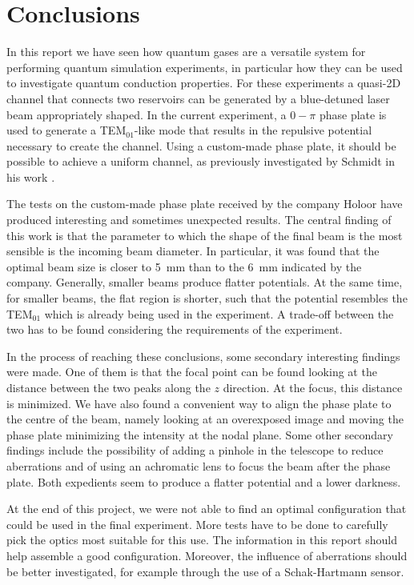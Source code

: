 \chapter{Conclusions}
In this report we have seen how quantum gases are a versatile system for performing quantum simulation experiments, in particular how they can be used to investigate quantum conduction properties. For these experiments a quasi-2D channel that connects two reservoirs can be generated by a blue-detuned laser beam appropriately shaped. In the current experiment, a $0-\pi$ phase plate is used to generate a TEM$_{01}$-like mode that results in the repulsive potential necessary to create the channel. Using a custom-made phase plate, it should be possible to achieve a uniform channel, as previously investigated by Schmidt in his work \cite{schmidt2021}.

The tests on the custom-made phase plate received by the company Holoor have produced interesting and sometimes unexpected results. The central finding of this work is that the parameter to which the shape of the final beam is the most sensible is the incoming beam diameter. In particular, it was found that the optimal beam size is closer to \SI{5}{mm} than to the \SI{6}{mm} indicated by the company. Generally, smaller beams produce flatter potentials. At the same time, for smaller beams, the flat region is shorter, such that the potential resembles the TEM$_{01}$ which is already being used in the experiment. A trade-off between the two has to be found considering the requirements of the experiment.

In the process of reaching these conclusions, some secondary interesting findings were made. One of them is that the focal point can be found looking at the distance between the two peaks along the $z$ direction. At the focus, this distance is minimized. We have also found a convenient way to align the phase plate to the centre of the beam, namely looking at an overexposed image and moving the phase plate minimizing the intensity at the nodal plane. Some other secondary findings include the  possibility of adding a pinhole in the telescope to reduce aberrations and of using an achromatic lens to focus the beam after the phase plate. Both expedients seem to produce a flatter potential and a lower darkness.

At the end of this project, we were not able to find an optimal configuration that could be used in the final experiment. More tests have to be done to carefully pick the optics most suitable for this use. The information in this report should help assemble a good configuration. Moreover, the influence of aberrations should be better investigated, for example through the use of a Schak-Hartmann sensor.